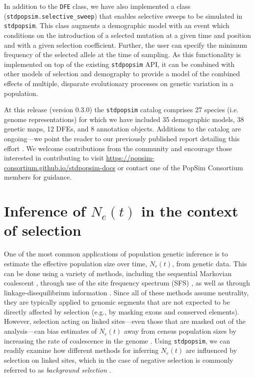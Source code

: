 \documentclass[hidelinks]{article}
\newcommand{\stdpopsim}{\texttt{stdpopsim}\xspace}
\begin{document}
    In addition to the \texttt{DFE} class, we have also implemented a class (\texttt{stdpopsim.selective\_sweep})
    that enables selective sweeps to be simulated in \stdpopsim.
    This class augments a demographic model with an event
    which conditions on the introduction of a selected mutation at a given time and position
    and with a given selection coefficient. Further, the user can specify the minimum frequency
    of the selected allele at the time of sampling. As this functionality is implemented
    on top of the existing \stdpopsim API, it can be combined with other models of selection
    and demography to provide a model of the combined effects of multiple, disparate evolutionary processes
    on genetic variation in a population.


    At this release (version 0.3.0) the \stdpopsim catalog comprises 27 species (i.e. genome representations)
    for which we have included 35 demographic models, 38 genetic maps, 12 DFEs, and 8 annotation objects. %
    Additions to the catalog are ongoing---we point the reader to our previously published
    report detailing this effort \citep{lauterbur2023expanding}. We welcome contributions from the
    community and encourage those interested in contributing to visit \url{https://popsim-consortium.github.io/stdpopsim-docs}
    or contact one of the PopSim Consortium members for guidance.



    \section*{Inference of $N_e(t)$ in the context of selection}
    One of the most common applications of population genetic inference is to estimate
    the effective population size over time, $N_e(t)$, from genetic data. This can be done
    using a variety of methods, including the sequential Markovian coalescent
    \citep{li2011inference,Schiffels2020,terhorst2017robust},
    through use of the site frequency spectrum (SFS) \citep{liu2020stairway},
    as well as through linkage-disequilibrium information \citep{santiago2020recent}.
    Since all of these methods assume neutrality, they are typically applied to genomic
    segments that are not expected to be directly affected by selection (e.g., by masking exons
    and conserved elements).
    However, selection acting on linked sites---even those that are masked out of the
    analysis---can bias estimates of $N_e(t)$
    away from census population sizes by increasing the
    rate of coalescence in the genome \citep[e.g.][]{schrider2016effects}.
    Using \stdpopsim, we can readily examine how different methods for inferring $N_e(t)$
    are influenced by selection on linked sites,
    which in the case of negative selection is commonly referred to as \emph{background selection}
    \citep{charlesworth1993effect,hudson1995deleterious}.
\end{document}
